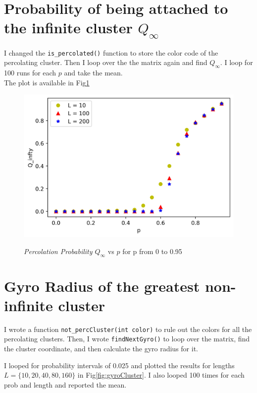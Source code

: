 \documentclass[12pt]{article}
\begin{document}
	\section{Probability of being attached to the infinite cluster $Q_\infty$}
	I changed the \texttt{is\_percolated()} function to store the color code of the percolating cluster. Then I 
	loop over the the matrix again and find $Q_\infty$. I loop for 100 runs for each $p$ and take the mean.\\
	The plot is available in Fig\ref{fig:percProb}
	\begin{figure}[h!]
		\includegraphics[width=0.9\linewidth]{../p4/percProb.jpg}
		\label{fig:percProb}
		\caption{\emph{Percolation Probability $Q_\infty$} vs \emph{$p$} for p from 0 to 0.95}
	\end{figure}
	
	\section{Gyro Radius of the greatest non-infinite cluster}
	I wrote a function \texttt{not\_percCluster(int color)} to rule out the colors for all the percolating clusters. Then, I wrote \texttt{findNextGyro()} to loop over the matrix, find the cluster coordinate, and then calculate the gyro radius for it.
	
	I looped for probability intervals of 0.025 and plotted the results for lengths $L = \{10, 20, 40, 80, 160\}$ in 
	Fig\ref{fig:gyroCluster}. I also looped 100 times for each prob and length and reported the mean.
	
\end{document}
